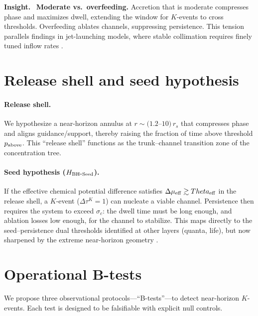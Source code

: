 \documentclass[12pt,a4paper,oneside]{scrreprt}
\def\Theta{Theta}%
\newenvironment{insight}{\par\vspace{0.5em}\noindent\textbf{Insight.}\ }{\par\vspace{0.5em}}
\begin{document}
\begin{insight}
\textbf{Moderate vs.\ overfeeding.} 
Accretion that is moderate compresses phase and maximizes dwell, 
extending the window for $K$-events to cross thresholds. 
Overfeeding ablates channels, suppressing persistence. 
This tension parallels findings in jet-launching models, 
where stable collimation requires finely tuned inflow rates 
\citep{BlandfordZnajek1977,Tchekhovskoy2011}.
\end{insight}

\section{Release shell and seed hypothesis}\label{sec:bh-release}

\paragraph{Release shell.} 
We hypothesize a near-horizon annulus at 
$r \sim (1.2$--$10)\, r_s$ that compresses phase and 
aligns guidance/support, thereby raising the fraction 
of time above threshold $p_{\rm above}$. 
This ``release shell'' functions as the trunk–channel transition 
zone of the concentration tree.

\paragraph{Seed hypothesis ($H_{\rm BH\mbox{-}Seed}$).} 
If the effective chemical potential difference satisfies 
$\Delta\mu_{\rm eff} \gtrsim \Theta_{\rm eff}$ in the release shell, 
a $K$-event ($\Delta \tau^K = 1$) can nucleate a viable channel. 
Persistence then requires the system to exceed $\sigma_c$: 
the dwell time must be long enough, and ablation losses 
low enough, for the channel to stabilize. 
This maps directly to the seed–persistence dual thresholds 
identified at other layers (quanta, life), but now sharpened 
by the extreme near-horizon geometry 
\citep{EventHorizonTelescope2019ApJL,EventHorizonTelescope2022Science}.

\section{Operational B-tests}\label{sec:bh-tests}

We propose three observational protocols---``B-tests''---to detect 
near-horizon $K$-events. 
Each test is designed to be falsifiable with explicit null controls.
\end{document}
